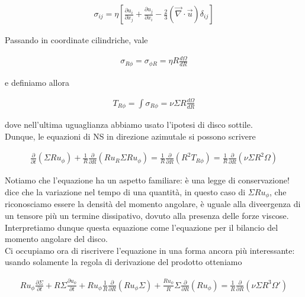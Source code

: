 \documentclass{report}
\begin{document}
\begin{align}
    \sigma_{ij} = \eta \left[\frac{\partial u_i}{\partial x_j} + \frac{\partial u_j}{\partial x_i} - \frac{2}{3}(\vec{\nabla}\cdot \vec{u})\delta_{ij}\right]
\end{align}

Passando in coordinate cilindriche, vale 

\begin{align}
    \sigma_{R\phi} = \sigma_{\phi R} = \eta R \frac{d\Omega}{dR}
\end{align}


e definiamo allora 

\begin{align}
    T_{R\phi} = \int \sigma_{R\phi} = \nu \Sigma R \frac{d\Omega}{dR}
\end{align}

dove nell'ultima uguaglianza abbiamo usato l'ipotesi di disco sottile. \\

Dunque, le equazioni di NS in direzione azimutale si possono scrivere 

\begin{align}
    \frac{\partial }{\partial t}(\Sigma R u_\phi) + \frac{1}{R}\frac{\partial}{\partial R}(R u_R \Sigma R u_\phi) = \frac{1}{R}\frac{\partial}{\partial R}(R^2 T_{R\phi}) = \frac{1}{R}\frac{\partial}{\partial R}(\nu \Sigma R^2 \Omega)
\end{align}

Notiamo che l'equazione ha un aspetto familiare: è una legge di conservazione! dice che la variazione nel tempo di una quantità, in questo caso di \(\Sigma R u_\phi\), che riconosciamo essere la densità del momento angolare, è uguale alla diveergenza di un tensore più un termine dissipativo, dovuto alla presenza delle forze viscose. Interpretiamo dunque questa equazione come l'equazione per il bilancio del momento angolare del disco.  \\

Ci occupiamo ora di riscrivere l'equazione in una forma ancora più interessante: usando solamente la regola di derivazione del prodotto otteniamo

\begin{align}
    R u_{\phi} \frac{\partial \Sigma}{\partial t} + R\Sigma \frac{\partial u_\phi}{\partial t} + Ru_\phi \frac{1}{R}\frac{\partial}{\partial R}(Ru_\phi \Sigma) + \frac{Ru_\phi}{R}\Sigma \frac{\partial}{\partial R}(Ru_\phi) = \frac{1}{R}\frac{\partial}{\partial R}(\nu \Sigma R^3 \Omega')
\end{align}
\end{document}
